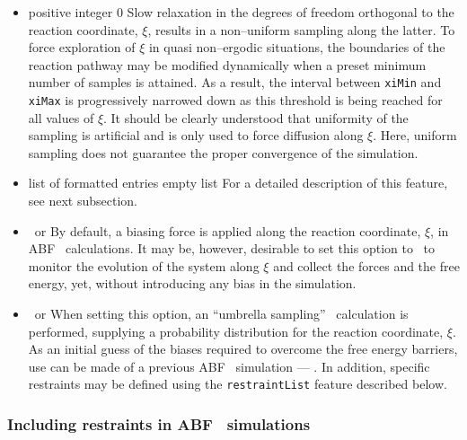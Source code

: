 \begin{itemize}
\item
{}
{positive integer}
{0}
{Slow relaxation in the degrees of freedom orthogonal to the reaction
 coordinate, $\xi$, results in a non--uniform sampling along the latter.
 To force exploration of $\xi$ in quasi non--ergodic situations, the
 boundaries of the reaction pathway may be modified dynamically when a
 preset minimum number of samples is attained. As a result, the
 interval between {\tt xiMin} and {\tt xiMax} is progressively narrowed
 down as this threshold is being reached for all values of $\xi$.
 It should be clearly understood that uniformity of the sampling
 is artificial and is only used to force diffusion along $\xi$. Here,
 uniform sampling does not guarantee the proper convergence of the
 simulation. }


\item
{}
{list of formatted entries}
{empty list}
{For a detailed description of
 this feature, see next subsection.}


\item
{}
{\yes \ or \no}
{\yes}
{By default, a biasing force is applied along the reaction coordinate,
 $\xi$, in ABF \ calculations. It may be, however, desirable to set
 this option to \no \ to monitor the evolution of the system along
 $\xi$ and collect the forces and the free energy, yet,
 without introducing any bias in the simulation.}


\item
{}
{\yes \ or \no}
{\no}
{When setting this option, an ``umbrella sampling''~\cite{torr_77_2}
 calculation
 is performed, supplying a probability distribution
 for the reaction coordinate, $\xi$. As an initial
 guess of the biases required to overcome the free energy
 barriers, use can be made of a previous ABF \ simulation ---
 . In addition, specific restraints may
 be defined using the {\tt restraintList} feature described below.}

\end{itemize}



\subsubsection{Including restraints in ABF \ simulations}


